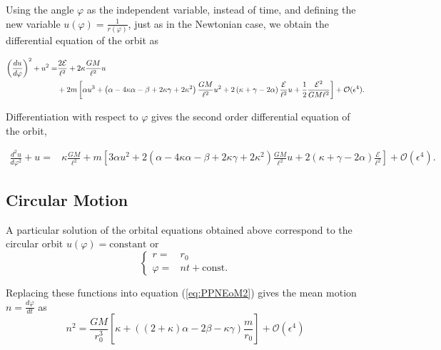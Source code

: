 Using the angle $\varphi$ as the independent variable, instead of time, and defining the new variable $u(\varphi) = \frac{1}{r(\varphi)}$, just as in the Newtonian case, we obtain the differential equation of the orbit as
\begin{footnotesize}
\begin{align}
\left( \frac{du}{d\varphi} \right)^2 + u^2 = &\frac{2\mathcal{E}}{\ell^2} + 2\kappa \frac{GM}{\ell^2} u  \notag \\
 & + 2m \left[  \alpha u^3 +    \left( \alpha - 4\kappa \alpha - \beta + 2\kappa \gamma  + 2\kappa^2  \right) \frac{GM}{\ell^2} u^2 + 2 \left( \kappa + \gamma - 2\alpha \right) \frac{\mathcal{E}}{\ell^2} u + \frac{1}{2}\frac{\mathcal{E} ^2}{GM\ell^2} \right] + \mathcal{O} ( \epsilon ^4 ).\label{eq:FirstOrderOrbitEquationOB}
\end{align}
\end{footnotesize}

Differentiation with respect to $\varphi$ gives the second order differential equation of the orbit,
\begin{footnotesize}
\begin{align}
\frac{d^2 u}{d\varphi^2} + u = & \kappa \frac{GM}{\ell^2} + m \left[  3\alpha u^2  +2 \left( \alpha - 4\kappa \alpha - \beta + 2\kappa \gamma  + 2\kappa^2  \right) \frac{GM}{\ell^2} u + 2 \left( \kappa + \gamma - 2\alpha \right) \frac{\mathcal{E}}{\ell^2}  \right] + \mathcal{O} ( \epsilon ^4 ). \label{eq:SecondOrderOrbitEquationOB}
\end{align}
\end{footnotesize}

\subsection{Circular Motion}

A particular solution of the orbital equations obtained above correspond to the circular orbit $u(\varphi)=\textrm{constant}$ or
\begin{equation}
\begin{cases}
r = &r_0 \\
\varphi = &nt + \textrm{const.}
\end{cases}
\end{equation}

Replacing these functions into equation (\eqref{eq:PPNEoM2}) gives the mean motion $n=\frac{d\varphi}{dt}$ as
\begin{equation}
n^2 = \frac{GM}{r_0^3}  \left[ \kappa + \left( (2+\kappa)\alpha - 2\beta - \kappa \gamma \right) \frac{m}{r_0} \right] + \mathcal{O} ( \epsilon ^4 )  
\end{equation}

